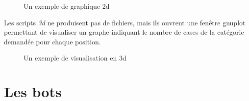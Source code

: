 \documentclass[10pt,a4paper]{report}
\begin{document}
\begin{figure}[H]
  \caption{\label{fig:2d_graph} Un exemple de graphique 2d}
\end{figure}


Les scripts \emph{3d} ne produisent pas de fichiers, mais ils ouvrent une
fenêtre gnuplot permettant de visualiser un graphe indiquant le nombre de cases
de la catégorie demandée pour chaque position. 

\begin{figure}[H]
  \caption{\label{fig:3d_graph} Un exemple de visualisation en 3d}
\end{figure}

\chapter{Les bots}
\end{document}
